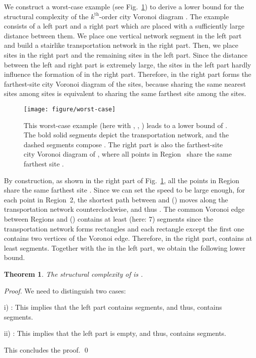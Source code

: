 \documentclass[11pt]{llncs}
\newtheorem{Theorem}{Theorem}
\newcommand{\kth}{\ensuremath{k^{\mathrm{th}}}\xspace}
\newcommand{\kthorder}{\kth-order\xspace}
\begin{document}
We construct a worst-case example (see Fig.~\ref{fig-worst}) to derive a lower bound for the structural complexity of the \kthorder city Voronoi diagram .
The example consists of a left part and a right part which are placed with a sufficiently large distance between them.
We place one vertical network segment in the left part
and build a stairlike transportation network in the right part.
Then, we place  sites in the right part and the remaining  sites in the left part.
Since the distance between the left and right part is extremely large,
the  sites in the left part hardly influence the formation of  in the right part.
Therefore,  in the right part forms the farthest-site city Voronoi diagram of the  sites,
because sharing the same  nearest sites among  sites
is equivalent to sharing the same farthest site among the  sites.

\begin{figure}[tb]
\center
\texttt{[image: figure/worst-case]}
\caption{This worst-case example
(here with , , ) leads to a lower bound of .
The bold solid segments depict the transportation network,
and the dashed segments compose .
The right part is also the farthest-site city Voronoi diagram of ,
where all points in Region~ share the same farthest site .
}\label{fig-worst}
\end{figure}


By construction,
as shown in the right part of Fig.~\ref{fig-worst},
all the points in Region~ share the same farthest site .
Since we can set the speed  to be large enough,
for each point  in Region~2,
the shortest path between  and  () moves along the transportation network counterclockwise,
and thus .
The common Voronoi edge between Regions  and ()
contains at least  (here: 7) segments
since the transportation network forms  rectangles
and each rectangle except the first one contains two vertices of the Voronoi edge.
Therefore, in the right part,
 contains at least  segments.
Together with the  in the left part, we obtain the following lower bound.


\newcommand{\thmlowerdiagramtext}{The structural complexity of  is .
}


\begin{Theorem}\label{thm-lower-diagram}
\thmlowerdiagramtext
\end{Theorem}
\begin{proof}
We need to distinguish two cases:

i) :
This implies that the left part contains  segments, and thus,  contains  segments.

ii) :
This implies that the left part is empty, and thus,
 contains  segments.

This concludes the proof. \qed
\end{proof}
\end{document}
